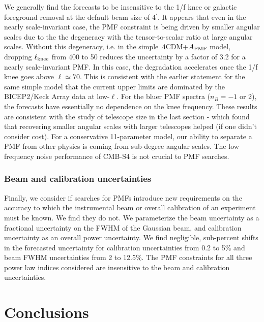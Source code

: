 \documentclass[apj]{emulateapj}
\newcommand{\apmf}{\ensuremath{A_{\rm PMF}}}
\newcommand{\lcdm}{\ensuremath{\Lambda}CDM}
\newcommand{\lknee}{\ensuremath{\ell_{\rm knee}}}
\begin{document}
We generally find the forecasts to be insensitive to the 1/f knee or galactic foreground removal at the default beam size of 4$^\prime$. 
It appears that even in the nearly scale-invariant case, the PMF constraint is being driven by smaller angular scales due to the the degeneracy with the tensor-to-scalar ratio at large angular scales. 
Without this degeneracy, i.e. in the simple \lcdm{}+\apmf{} model, dropping \lknee{} from 400 to 50 reduces the uncertainty by a factor of 3.2 for a nearly scale-invariant PMF. 
In this case, the degradation accelerates once the 1/f knee goes above $\ell \simeq 70$. 
This is consistent with the earlier statement for the same simple model that the current upper limits are dominated by the BICEP2/Keck Array data at low-$\ell$. 
For the bluer PMF spectra ($n_B=-1$ or 2), the forecasts have essentially no dependence on the knee frequency. 
These results are consistent with the study of telescope size in the last section - which found that recovering smaller angular scales with larger telescopes helped (if one didn't consider cost).
For a conservative 11-parameter model, our ability to separate a PMF from other physics is coming from sub-degree angular scales. 
The low frequency noise performance of CMB-S4 is not crucial to PMF searches. 


\subsubsection{Beam and calibration uncertainties}

Finally, we consider if searches for PMFs introduce new requirements on the accuracy to which the instrumental beam or overall calibration of an experiment must be known. 
We find they do not. 
We parameterize the beam uncertainty as a fractional uncertainty on the FWHM of the Gaussian beam, and calibration uncertainty as an overall power uncertainty. 
We find negligible, sub-percent shifts in the forecasted uncertainty for calibration uncertainties from 0.2 to 5\% and beam FWHM uncertainties from 2 to 12.5\%. 
The PMF constraints  for all three power law indices considered are insensitive to the beam and calibration uncertainties. 

\section{Conclusions}
\label{sec:conclusions}
\end{document}

